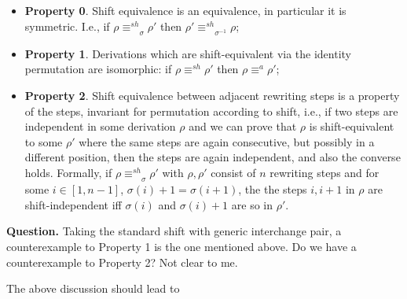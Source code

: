 \documentclass{llncs}
\newcommand{\interval}[2][1]{\ensuremath{[{#1},{#2}]}}
\newcommand{\shifteq}[1][]{\ensuremath{\mathrel{{\equiv}^\mathit{sh}_{#1}}}}
\begin{document}
\begin{itemize}
\item \textbf{Property 0}. Shift equivalence is an equivalence, in particular it is symmetric. I.e., if  $\rho \shifteq_\sigma \rho'$ then $\rho' \shifteq_{\sigma^{-1}} \rho$; 

\item \textbf{Property 1}. Derivations which are shift-equivalent via the
  identity permutation are isomorphic: if $\rho \shifteq \rho'$ then
  $\rho \equiv^a \rho'$; 
  
\item \textbf{Property 2}. Shift equivalence between adjacent rewriting steps
  is a property of the steps, invariant for permutation according to
  shift, i.e., if two steps are independent in some derivation $\rho$
  and we can prove that $\rho$ is shift-equivalent to some $\rho'$
  where the same steps are again consecutive, but possibly in a
  different position, then the steps are again independent, and also
  the converse holds. Formally, if $\rho \shifteq_\sigma \rho'$ with
  $\rho, \rho'$ consist of $n$ rewriting steps and for some
  $i \in \interval{n-1}$, $\sigma(i)+1 = \sigma(i+1)$, the the steps
  $i, i+1$ in $\rho$ are shift-independent iff $\sigma(i)$ and
  $\sigma(i)+1$ are so in $\rho'$.
\end{itemize}




\textbf{Question.} Taking the standard shift with generic interchange pair, a counterexample to Property 1 is the one mentioned above.  Do we have a counterexample to Property 2? Not clear to me.


The above discussion should lead to
\end{document}
